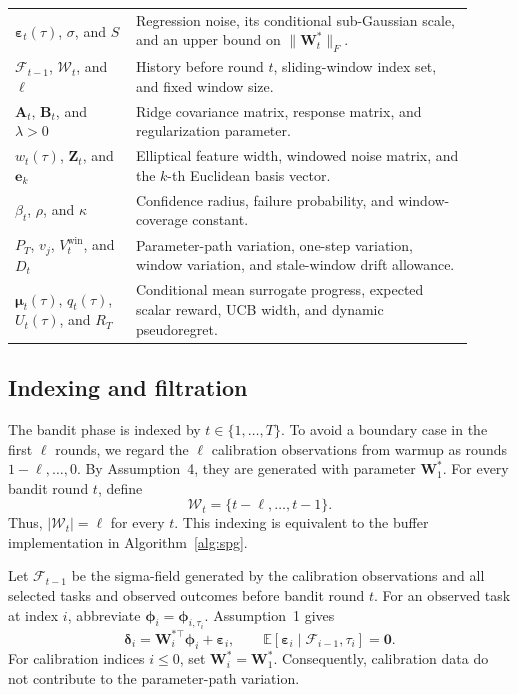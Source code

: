 \begin{center}
\begin{tabular}{p{0.24\linewidth}p{0.67\linewidth}}
\(\boldsymbol{\varepsilon}_t(\tau)\), \(\sigma\), and \(S\) & Regression noise, its conditional sub-Gaussian scale, and an upper bound on \(\lVert\mathbf{W}_t^*\rVert_F\). \\
\(\mathcal{F}_{t-1}\), \(\mathcal{W}_t\), and \(\ell\) & History before round \(t\), sliding-window index set, and fixed window size. \\
\(\mathbf{A}_t\), \(\mathbf{B}_t\), and \(\lambda>0\) & Ridge covariance matrix, response matrix, and regularization parameter. \\
\(w_t(\tau)\), \(\mathbf{Z}_t\), and \(\mathbf{e}_k\) & Elliptical feature width, windowed noise matrix, and the \(k\)-th Euclidean basis vector. \\
\(\beta_t\), \(\rho\), and \(\kappa\) & Confidence radius, failure probability, and window-coverage constant. \\
\(P_T\), \(v_j\), \(V_t^{\mathrm{win}}\), and \(D_t\) & Parameter-path variation, one-step variation, window variation, and stale-window drift allowance. \\
\(\boldsymbol{\mu}_t(\tau)\), \(q_t(\tau)\), \(U_t(\tau)\), and \(R_T\) & Conditional mean surrogate progress, expected scalar reward, UCB width, and dynamic pseudoregret. \\
\hline
\end{tabular}
\end{center}

\subsection{Indexing and filtration}

The bandit phase is indexed by \(t\in\{1,\ldots,T\}\). To avoid a boundary case in the first \(\ell\) rounds, we regard the \(\ell\) calibration observations from warmup as rounds \(1-\ell,\ldots,0\). By Assumption~4, they are generated with parameter \(\mathbf{W}_1^*\). For every bandit round \(t\), define
\[
    \mathcal{W}_t=\{t-\ell,\ldots,t-1\}.
\]
Thus, \(|\mathcal{W}_t|=\ell\) for every \(t\). This indexing is equivalent to the buffer implementation in Algorithm~\ref{alg:spg}.

Let \(\mathcal{F}_{t-1}\) be the sigma-field generated by the calibration observations and all selected tasks and observed outcomes before bandit round \(t\). For an observed task at index \(i\), abbreviate \(\boldsymbol{\phi}_{i}=\boldsymbol{\phi}_{i,\tau_i}\). Assumption~1 gives
\begin{equation}
    \boldsymbol{\delta}_{i}=\mathbf{W}_i^{*\top}\boldsymbol{\phi}_{i}+\boldsymbol{\varepsilon}_{i},
    \qquad
    \mathbb{E}[\boldsymbol{\varepsilon}_{i}\mid\mathcal{F}_{i-1},\tau_i]=\mathbf{0}.
    \label{eq:app-linear-model}
\end{equation}
For calibration indices \(i\leq0\), set \(\mathbf{W}_i^*=\mathbf{W}_1^*\). Consequently, calibration data do not contribute to the parameter-path variation.

